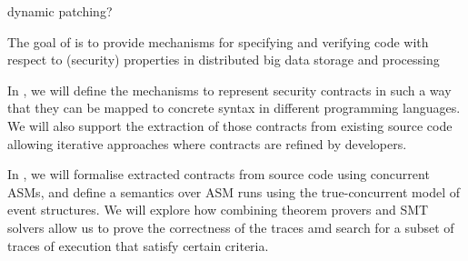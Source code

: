 \begin{Workpackage}{\thewpno}
\begin{WPObjectives}
dynamic patching?




\end{WPObjectives}

\begin{WPDescription}

The goal of \theWP{} is to provide mechanisms for specifying and verifying code with respect to
(security) properties in distributed big data storage and processing

\end{WPDescription}



\begin{Task}

\TaskResults{%
}
\TaskHeader{}

In \theTask, we will define the mechanisms to represent security contracts
in such a way that they can be mapped to concrete syntax in different
programming languages. We will also support the extraction of those contracts
from existing source code allowing iterative approaches where contracts
are refined by developers.
\end{Task}

\begin{Task}

\TaskResults{%
}
\TaskHeader{}

In \theTask, we will formalise extracted contracts from source code using concurrent ASMs, and define a semantics over ASM runs using the true-concurrent model of event structures. 
We will explore how combining theorem provers and SMT solvers allow us to prove the correctness of the traces amd search for a subset of traces of execution that satisfy certain criteria.

\end{Task}



\end{Workpackage}
